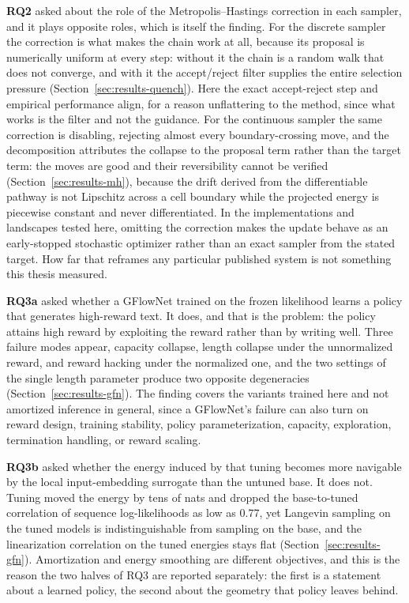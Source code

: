 \textbf{RQ2} asked about the role of the Metropolis--Hastings correction in each sampler, and it plays opposite roles, which is itself the finding. For the discrete sampler the correction is what makes the chain work at all, because its proposal is numerically uniform at every step: without it the chain is a random walk that does not converge, and with it the accept/reject filter supplies the entire selection pressure (Section~\ref{sec:results-quench}). Here the exact accept-reject step and empirical performance align, for a reason unflattering to the method, since what works is the filter and not the guidance. For the continuous sampler the same correction is disabling, rejecting almost every boundary-crossing move, and the decomposition attributes the collapse to the proposal term rather than the target term: the moves are good and their reversibility cannot be verified (Section~\ref{sec:results-mh}), because the drift derived from the differentiable pathway is not Lipschitz across a cell boundary while the projected energy is piecewise constant and never differentiated. In the implementations and landscapes tested here, omitting the correction makes the update behave as an early-stopped stochastic optimizer rather than an exact sampler from the stated target. How far that reframes any particular published system is not something this thesis measured.

\textbf{RQ3a} asked whether a GFlowNet trained on the frozen likelihood learns a policy that generates high-reward text. It does, and that is the problem: the policy attains high reward by exploiting the reward rather than by writing well. Three failure modes appear, capacity collapse, length collapse under the unnormalized reward, and reward hacking under the normalized one, and the two settings of the single length parameter produce two opposite degeneracies (Section~\ref{sec:results-gfn}). The finding covers the variants trained here and not amortized inference in general, since a GFlowNet's failure can also turn on reward design, training stability, policy parameterization, capacity, exploration, termination handling, or reward scaling.

\textbf{RQ3b} asked whether the energy induced by that tuning becomes more navigable by the local input-embedding surrogate than the untuned base. It does not. Tuning moved the energy by tens of nats and dropped the base-to-tuned correlation of sequence log-likelihoods as low as $0.77$, yet Langevin sampling on the tuned models is indistinguishable from sampling on the base, and the linearization correlation on the tuned energies stays flat (Section~\ref{sec:results-gfn}). Amortization and energy smoothing are different objectives, and this is the reason the two halves of RQ3 are reported separately: the first is a statement about a learned policy, the second about the geometry that policy leaves behind.

